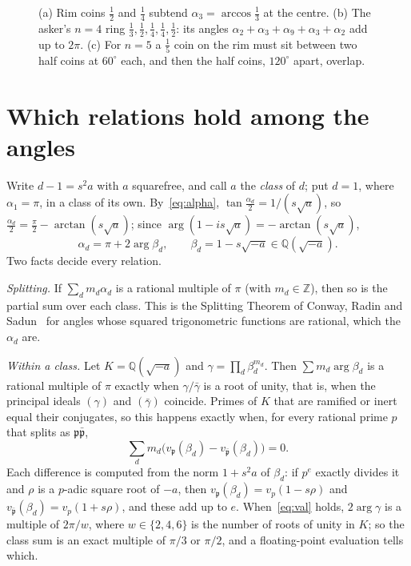 \documentclass[11pt]{amsart}
\theoremstyle{remark}
\begin{document}
\begin{figure}[ht]
\centering
\begin{tikzpicture}
  
\end{tikzpicture}
\caption{(a) Rim coins $\frac12$ and $\frac14$ subtend $\alpha_3=\arccos\frac13$ at the centre. (b) The asker's $n=4$ ring $\frac13,\frac12,\frac14,\frac14,\frac12$: its angles $\alpha_2+\alpha_3+\alpha_9+\alpha_3+\alpha_2$ add up to $2\pi$. (c) For $n=5$ a $\frac15$ coin on the rim must sit between two half coins at $60^\circ$ each, and then the half coins, $120^\circ$ apart, overlap.}
\label{fig:rim}
\end{figure}

\section{Which relations hold among the angles}

Write $d-1=s^2a$ with $a$ squarefree, and call $a$ the \emph{class} of $d$; put $d=1$, where $\alpha_1=\pi$, in a class of its own. By~\eqref{eq:alpha}, $\tan\frac{\alpha_d}2=1/(s\sqrt a)$, so $\frac{\alpha_d}2=\frac\pi2-\arctan(s\sqrt a)$; since $\arg(1-is\sqrt a)=-\arctan(s\sqrt a)$,
\begin{equation}\label{eq:arg}
\alpha_d=\pi+2\arg\beta_d,\qquad \beta_d=1-s\sqrt{-a}\in\mathbb Q(\sqrt{-a}).
\end{equation}
Two facts decide every relation.

\emph{Splitting.} If $\sum_dm_d\alpha_d$ is a rational multiple of $\pi$ (with $m_d\in\mathbb Z$), then so is the partial sum over each class. This is the Splitting Theorem of Conway, Radin and Sadun~\cite{CRS} for angles whose squared trigonometric functions are rational, which the $\alpha_d$ are.

\emph{Within a class.} Let $K=\mathbb Q(\sqrt{-a})$ and $\gamma=\prod_d\beta_d^{m_d}$. Then $\sum m_d\arg\beta_d$ is a rational multiple of $\pi$ exactly when $\gamma/\bar\gamma$ is a root of unity, that is, when the principal ideals $(\gamma)$ and $(\bar\gamma)$ coincide. Primes of $K$ that are ramified or inert equal their conjugates, so this happens exactly when, for every rational prime $p$ that splits as $\mathfrak p\bar{\mathfrak p}$,
\begin{equation}\label{eq:val}
\sum_dm_d\bigl(v_{\mathfrak p}(\beta_d)-v_{\bar{\mathfrak p}}(\beta_d)\bigr)=0 .
\end{equation}
Each difference is computed from the norm $1+s^2a$ of $\beta_d$: if $p^e$ exactly divides it and $\rho$ is a $p$-adic square root of $-a$, then $v_{\mathfrak p}(\beta_d)=v_p(1-s\rho)$ and $v_{\bar{\mathfrak p}}(\beta_d)=v_p(1+s\rho)$, and these add up to $e$. When~\eqref{eq:val} holds, $2\arg\gamma$ is a multiple of $2\pi/w$, where $w\in\{2,4,6\}$ is the number of roots of unity in $K$; so the class sum is an exact multiple of $\pi/3$ or $\pi/2$, and a floating-point evaluation tells which.
\end{document}
